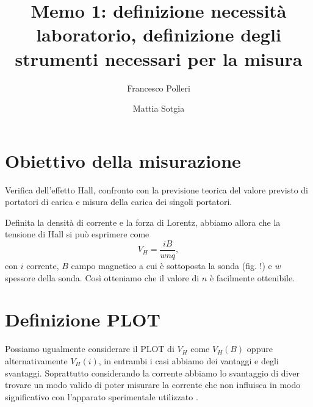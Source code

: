 \documentclass[fleqn,varvw]{memo}
\begin{document}
\title{Memo 1: definizione necessità laboratorio, definizione degli strumenti necessari per la misura}

\author{Francesco Polleri}
\author{Mattia Sotgia}


\revised{\today}

\begin{abstract}

\end{abstract}
\maketitle

\section{Obiettivo della misurazione}

Verifica dell'effetto Hall, confronto con la previsione teorica del valore previsto di portatori di carica e misura della carica dei singoli portatori.

Definita la densità di corrente e la forza di Lorentz, abbiamo allora che la tensione di Hall si può esprimere come \begin{equation}
    V_H = \frac{iB}{wnq},
\end{equation} con $i$ corrente, $B$ campo magnetico a cui è sottoposta la sonda (fig. !) e $w$ spessore della sonda. Così otteniamo che il valore di $n$ è facilmente ottenibile. 

\section{Definizione PLOT}

Possiamo ugualmente considerare il PLOT di $V_H$ come $V_H(B)$ oppure alternativamente $V_H(i)$, in entrambi i casi abbiamo dei vantaggi e degli svantaggi. Soprattutto considerando la corrente abbiamo lo svantaggio di diver trovare un modo valido di poter misurare la corrente che non influisca in modo significativo con l'apparato sperimentale utilizzato .
\end{document}
